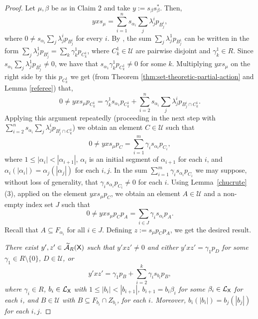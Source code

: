 \documentclass[a4paper,12pt]{amsart}
\theoremstyle{definition}
\theoremstyle{remark}
\numberwithin{equation}{section}
\newcommand{\osf}{{\normalfont \textsf{X}}}
\newcommand{\lang}{\CL_{\osf}}
\newcommand{\ualgshift}{\TCA_R(\osf)}
\newcommand{\CA}{\mathcal{A}}
\newcommand{\CL}{\mathcal{L}}
\newcommand{\TCA}{\widetilde{\CA}}
\newcommand{\TCB}{\mathcal{U}}
\begin{document}
\begin{proof}
Let $\mu, \beta$ be as in Claim 2 and take $y:=s_\beta s_\beta^*$. Then,
$$yxs_\mu=\sum\limits_{i=1}^n s_{\alpha_i}\sum\limits_j \lambda_j^ip_{B_j^i},$$  where $0\neq s_{\alpha_i} \sum\limits_j \lambda_j^ip_{B_j^i}$ for every $i$. 
By \cite[Lemma 3.5]{BCGW21}, the sum $\sum \limits_j \lambda_j^1p_{B_j^1}$ can be written in the form $\sum \limits_j \lambda_j^1p_{B_j^i}=\sum\limits_k {\gamma_k^1}p_{C_k^1}$, where $C_k^1 \in \TCB$ are pairwise disjoint and $\gamma_k^1\in R$.
Since $s_{\alpha_1}\sum\limits_j \lambda_j^1p_{B_j^1}\neq 0$, we have that $s_{\alpha_1}\gamma_k^1p_{C_k^1}\neq 0$ for some $k$. Multiplying $yxs_\mu$ on the right side by this $p_{C_k^1}$ we get (from Theorem \ref{thm:set-theoretic-partial-action} and Lemma \ref{referee}) that,
$$0\neq yxs_\mu p_{C_k^1}=\gamma_k^1s_{\alpha_1}p_{C_k^1}+\sum\limits_{i=2}^n s_{\alpha_i}\sum\limits_j \lambda_j^ip_{B_j^i\cap C_k^1}.$$
Applying this argument repeatedly (proceeding in the next step with $\sum\limits_{i=2}^n s_{\alpha_i}\sum\limits_j \lambda_j^ip_{B_j^i\cap C_k^1}$) we obtain an element $C\in \TCB$ such that 
$$0\neq y xs_\mu p_C=\sum\limits_{i=1}^m\gamma_is_{\alpha_i}p_{C_i},$$ where $1\leq |\alpha_i|<|\alpha_{i+1}|$, $\alpha_i$ is an initial segment of $\alpha_{i+1}$ for each $i$, and $\alpha_i(|\alpha_i|)=\alpha_j(|\alpha_j|)$ for each $i,j$. In the sum $\sum\limits_{i=1}^m\gamma_is_{\alpha_i}p_{C_i}$ we may suppose, without loss of generality, that $\gamma_is_{\alpha_i}p_{C_i}\neq 0$ for each $i$.
Using Lemma~\ref{chucrute}(3), applied on the element $y x s_\mu p_C$, we obtain an element $A\in \TCB$ and a non-empty index set $J$ such that $$0\neq yxs_\mu p_Cp_A=\sum\limits_{i\in J}\gamma_i s_{\alpha_i}p_A.$$ Recall that $A \subseteq F_{\alpha_i}$ for all $i \in J$. Defining $z:=s_\mu p_C p_A$, we get the desired result.

\smallskip
{} {\it There exist $y',z'\in \ualgshift$ such that $y'xz'\neq 0$ and either $y'xz'=\gamma_1p_D$ for some $\gamma_1 \in R\setminus\{0\}$, $D\in \TCB$, or 
$$y'xz'=\gamma_1 p_B+\sum\limits_{i=2}^k\gamma_i s_{b_i} p_B,$$ where $\gamma_i \in R$, $b_i\in \lang$ with $1\leq |b_i|<|b_{i+1}|$, $b_{i+1}=b_i\beta_i$ for some $\beta_i \in \lang$ for each $i$, and $B\in \TCB$ with $B\subseteq F_{b_i}\cap Z_{b_i}$, for each $i$. Moreover, $b_i(|b_i|)=b_j(|b_j|)$ for each $i, j$.}
\smallskip


\end{proof}
\end{document}
